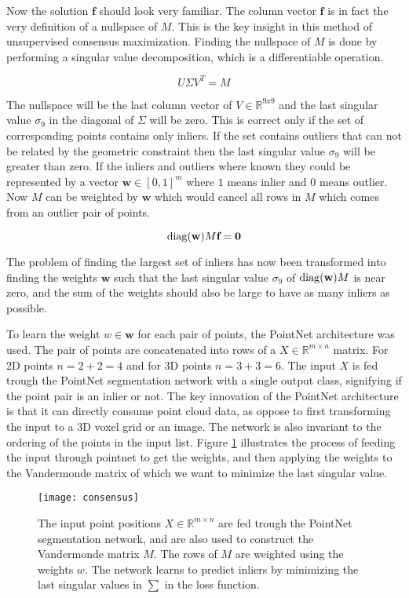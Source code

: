 Now the solution $\textbf{f}$ should look very familiar. The column vector $\textbf{f}$ is in fact the very definition of a nullspace of $M$. This is the key insight in this method of unsupervised consensus maximization. Finding the nullspace of $M$ is done by performing a singular value decomposition, which is a differentiable operation.

\[
U\Sigma V^T=M
\]

The nullspace will be the last column vector of $V \in \mathbb{R}^{9x9}$ and the last singular value $\sigma_9$ in the diagonal of $\Sigma$ will be zero. This is correct only if the set of corresponding points contains only inliers. If the set contains outliers that can not be related by the geometric constraint then the last singular value $\sigma_9$ will be greater than zero. If the inliers and outliers where known they could be represented by a vector $\textbf{w} \in [0,1]^m$ where $ 1 $ means inlier and $ 0 $ means outlier. Now $M$ can be weighted by $\textbf{w}$ which would cancel all rows in $M$ which comes from an outlier pair of points.

\[
\operatorname{diag}(\textbf{w}) M \textbf{f} = \textbf{0}
\] 

The problem of finding the largest set of inliers has now been transformed into finding the weights $\textbf{w}$ such that the last singular value $\sigma_9$ of $\operatorname{diag}(\textbf{w})M$ is near zero, and the sum of the weights should also be large to have as many inliers as possible.

To learn the weight $w \in \textbf{w}$ for each pair of points, the PointNet\cite{pointnet} architecture was used. The pair of points are concatenated into rows of a $ X \in \mathbb{R}^{m\times n} $ matrix. For 2D points $n = 2+2=4$ and for 3D points $n=3+3=6$. The input $X$ is fed trough the PointNet segmentation network with a single output class, signifying if the point pair is an inlier or not. The key innovation of the PointNet architecture is that it can directly consume point cloud data, as oppose to first transforming the input to a 3D voxel grid or an image. The network is also invariant to the ordering of the points in the input list. Figure \ref{fig:consensus} illustrates the process of feeding the input through pointnet to get the weights, and then applying the weights to the Vandermonde matrix of which we want to minimize the last singular value.

\begin{figure}[H]
	\centering
	\texttt{[image: consensus]}
	\caption{The input point positions $X\in \mathbb{R}^{m\times n}$ are fed trough the PointNet segmentation network, and are also used to construct the Vandermonde matrix $M$. The rows of $M$ are weighted using the weights $w$. The network learns to predict inliers by minimizing the last singular values in $\sum$ in the loss function.}
	\label{fig:consensus}
\end{figure}


